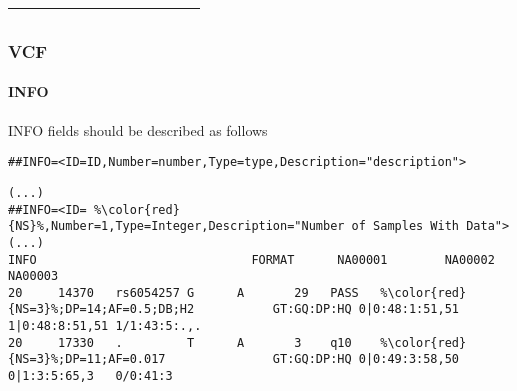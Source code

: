 \documentclass[xcolor=table]{beamer}
\begin{document}
\begin{frame}[fragile]
\begin{table}[]
{\begin{tabular}{|l|l|l|l|l|l|l|l|l|l|l|l|}
{\color[HTML]{FFFFFF} }                                      & {\color[HTML]{FFFFFF} }                                   & {\color[HTML]{FFFFFF} }                                  & {\color[HTML]{FFFFFF} }                                   & {\color[HTML]{FFFFFF} }                                   & {\color[HTML]{FFFFFF} }                                    & {\color[HTML]{FFFFFF} }                                      & {\color[HTML]{FFFFFF} }                                    & {\color[HTML]{FFFFFF} }                                  & {\color[HTML]{FFFFFF} }                                  & {\color[HTML]{FFFFFF} }                                  & {\color[HTML]{FFFFFF} }                                  \\ \hline
\end{tabular}
}
\end{table}

\end{frame}


\begin{frame}[fragile]
\frametitle{VCF}
\framesubtitle{INFO}

INFO fields should be described as follows
\begin{lstlisting}[breaklines=true]
##INFO=<ID=ID,Number=number,Type=type,Description="description">
\end{lstlisting}

\begin{lstlisting}[basicstyle=\tiny,breaklines=false,escapechar=\%]
(...)
##INFO=<ID= %\color{red}{NS}%,Number=1,Type=Integer,Description="Number of Samples With Data">
(...)
INFO                              FORMAT      NA00001        NA00002        NA00003
20     14370   rs6054257 G      A       29   PASS   %\color{red}{NS=3}%;DP=14;AF=0.5;DB;H2           GT:GQ:DP:HQ 0|0:48:1:51,51 1|0:48:8:51,51 1/1:43:5:.,.
20     17330   .         T      A       3    q10    %\color{red}{NS=3}%;DP=11;AF=0.017               GT:GQ:DP:HQ 0|0:49:3:58,50 0|1:3:5:65,3   0/0:41:3
\end{lstlisting}
\end{frame}
\end{document}
